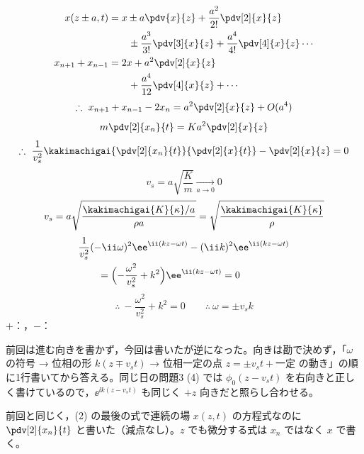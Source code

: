 \begin{align*}
  x(z\pm a,t)&=x\pm a\pdv{x}{z}+\frac{a^{2}}{2!}\pdv[2]{x}{z}\\
  &\qquad\pm\frac{a^{3}}{3!}\pdv[3]{x}{z}+\frac{a^{4}}{4!}\pdv[4]{x}{z}\cdots\\
  x_{n+1}+x_{n-1}&=2x+a^{2}\pdv[2]{x}{z}\\
  &\qquad+\frac{a^{4}}{12}\pdv[4]{x}{z}+\cdots
\end{align*}
\[ \therefore\ x_{n+1}+x_{n-1}-2x_n=a^{2}\pdv[2]{x}{z}+O(a^{4}) \]
\[ m\pdv[2]{x_n}{t}=Ka^{2}\pdv[2]{x}{z} \]
\[ \therefore\ \frac{1}{v_s^{2}}\kakimachigai{\pdv[2]{x_n}{t}}{\pdv[2]{x}{t}}-\pdv[2]{x}{z}=0 \]
\[ v_s=a\sqrt{\frac{K}{m}}\xrightarrow[a\to0]{}0 \]
\[ v_s=a\sqrt{\frac{\kakimachigai{K}{\kappa}/a}{\rho a}}=\sqrt{\frac{\kakimachigai{K}{\kappa}}{\rho}} \]
\begin{align*}
  &\frac{1}{v_s^{2}}(-\ii\omega)^{2}\ee^{\ii(kz-\omega t)}-(\ii k)^{2}\ee^{\ii(kz-\omega t)}\\
  &\qquad=\Bigl(-\frac{\omega^{2}}{v_s^{2}}+k^{2}\Bigr)\ee^{\ii(kz-\omega t)}=0
\end{align*}
\[ \therefore\ -\frac{\omega^{2}}{v_s^{2}}+k^{2}=0\qquad\therefore\ \omega=\pm v_sk \]
$+$：，$-$：
\item {} 前回は進む向きを書かず，今回は書いたが逆になった。向きは勘で決めず，「$\omega$ の符号 → 位相の形 $k(z\mp v_st)$ → 位相一定の点 $z=\pm v_st+\text{一定}$ の動き」の順に1行書いてから答える。同じ日の問題3 (4) では $\phi_0(z-v_st)$ を右向きと正しく書けているので，$\ee^{\ii k(z-v_st)}$ も同じく $+z$ 向きだと照らし合わせる。
\item {} 前回と同じく，(2) の最後の式で連続の場 $x(z,t)$ の方程式なのに $\pdv[2]{x_n}{t}$ と書いた（減点なし）。$z$ でも微分する式は $x_n$ ではなく $x$ で書く。
